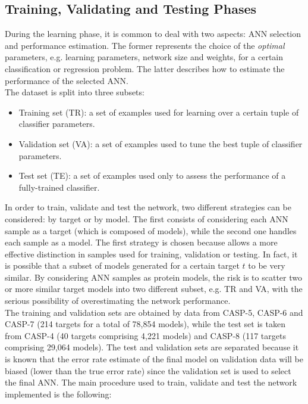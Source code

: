 \subsection{Training, Validating and Testing Phases}
\label{subsec:training_and_testing_phases}
During the learning phase, it is common to deal with two aspects: ANN selection and performance estimation. The former represents the choice of the \emph{optimal} parameters, e.g. learning parameters, network size and weights, for a certain classification or regression problem. The latter describes how to estimate the performance of the selected ANN.\\
The dataset is split into three subsets: 
\begin{itemize}
 \item Training set (TR): a set of examples used for learning over a certain tuple of classifier parameters.
 \item Validation set (VA): a set of examples used to tune the best tuple of classifier parameters.
 \item Test set (TE): a set of examples used only to assess the performance of a fully-trained classifier.
\end{itemize}
In order to train, validate and test the network, two different strategies can be considered: by target or by model. The first consists of considering each ANN sample as a target (which is composed of models), while the second one handles each sample as a model. The first strategy is chosen because allows a more effective distinction in samples used for training, validation or testing. In fact, it is possible that a subset of models generated for a certain target $t$ to be very similar. By considering ANN samples as protein models, the risk is to scatter two or more similar target models into two different subset, e.g. TR and VA, with the serious possibility of overestimating the network performance.\\
The training and validation sets are obtained by data from CASP-5, CASP-6 and CASP-7 (214 targets for a total of 78,854 models), while the test set is taken from CASP-4 (40 targets comprising 4,221 models) and CASP-8 (117 targets comprising 29,064 models). The test and validation sets are separated because it is known that the error rate estimate of the final model on validation data will be biased (lower than the true error rate) since the validation set is used to select the final ANN. The main procedure used to train, validate and test the network implemented is the following:

